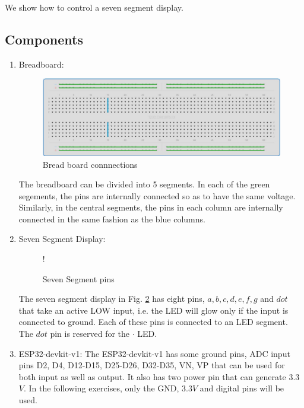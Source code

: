 We show how to control
a seven segment display.
\subsection{Components}
\begin{enumerate}[label=\arabic*.,ref=\theenumi]
\begin{table}[H]
	\centering

\caption{Components}
\label{table:components}
\end{table}
%
\item Breadboard:
\begin{figure}[H]
\begin{center}
\includegraphics[width=0.75\columnwidth]{ide/sevenseg/figs/breadboard}
\end{center}
\caption{Bread board connnections}
\label{fig:breadboard}
\end{figure}
%
The breadboard can be divided into 5 segments.  In each of the green segements, the pins are internally connected so as to have the same voltage.  Similarly, in the central segments, the pins in each column  are internally connected in the same fashion as the blue columns. 
\item Seven Segment Display:
\begin{figure}[!htb]
\begin{center}
 {!} {

}
\end{center}
\caption{Seven Segment pins}
\label{fig:sevenseg}
\end{figure}
%
The seven segment display in Fig. \ref{fig:sevenseg} has eight pins, $a, b, c, d, e, f, g$ and $dot$ that take an active LOW input, i.e.  the LED will glow only if the input is connected to ground.  Each of these pins is connected to an LED segment.  The $dot$ pin is  reserved for the $\cdot$ LED.  
%
\item ESP32-devkit-v1:
The ESP32-devkit-v1 has some ground pins, ADC input pins D2, D4, D12-D15, D25-D26, D32-D35, VN, VP that can be used for both input as well as output. It also has two power pin that can generate 3.3$V$.  In the following exercises, only the GND, 3.3$V$ and digital pins will be used.
\end{enumerate}
%
